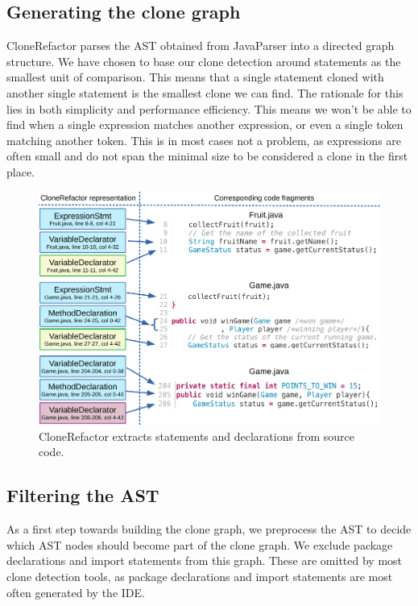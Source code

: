 \documentclass[conference]{IEEEtran}
\begin{document}
\subsection{Generating the clone graph}\label{sec:clonegraph}
CloneRefactor parses the AST obtained from JavaParser into a directed graph structure. We have chosen to base our clone detection around statements as the smallest unit of comparison. This means that a single statement cloned with another single statement is the smallest clone we can find. The rationale for this lies in both simplicity and performance efficiency. This means we won't be able to find when a single expression matches another expression, or even a single token matching another token. This is in most cases not a problem, as expressions are often small and do not span the minimal size to be considered a clone in the first place.

\begin{figure}
  \centering
  \includegraphics[width=1\textwidth]{img/CloneGraphCode}
  \caption{CloneRefactor extracts statements and declarations from source code.}
  \label{fig:clonegraph}
\end{figure}

\subsection{Filtering the AST}
As a first step towards building the clone graph, we preprocess the AST to decide which AST nodes should become part of the clone graph. We exclude package declarations and import statements from this graph. These are omitted by most clone detection tools, as package declarations and import statements are most often generated by the IDE.
\end{document}
